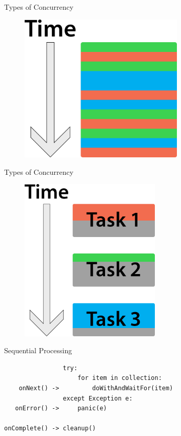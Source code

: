 \begin{frame}{Types of Concurrency}
	\begin{figure}[h]
		\includegraphics[width=0.7\textwidth,page=1]{gfx/asynchronous_nowait}
	\end{figure}
\end{frame}

\begin{frame}{Types of Concurrency}
	\begin{figure}[h]
		\includegraphics[width=0.6\textwidth,page=1]{gfx/single_threaded_wait}
	\end{figure}
\end{frame}

\begin{frame}[fragile]{Sequential Processing}
    \begin{verbatim}
                try:
                    for item in collection:
    onNext() ->         doWithAndWaitFor(item)
                except Exception e:
   onError() ->     panic(e)

onComplete() -> cleanup()
    \end{verbatim}
\end{frame}

